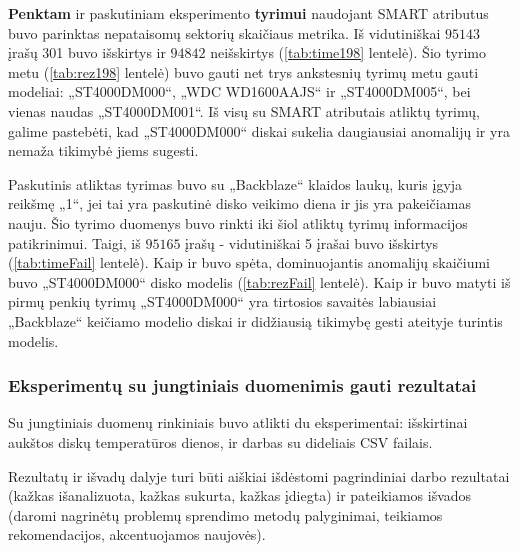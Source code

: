 \documentclass{VUMIFPSkursinis}
\begin{document}
\textbf{Penktam} ir paskutiniam eksperimento \textbf{tyrimui} naudojant SMART atributus buvo parinktas nepataisomų sektorių skaičiaus metrika. Iš vidutiniškai $95 143$ įrašų 301 buvo išskirtys ir $94 842$ neišskirtys (\ref{tab:time198} lentelė). Šio tyrimo metu (\ref{tab:rez198} lentelė) buvo gauti net trys ankstesnių tyrimų metu gauti modeliai: „ST4000DM000“, „WDC WD1600AAJS“ ir „ST4000DM005“, bei vienas naudas „ST4000DM001“. Iš visų su SMART atributais atliktų tyrimų, galime pastebėti, kad „ST4000DM000“ diskai sukelia daugiausiai anomalijų ir yra nemaža tikimybė jiems sugesti.

Paskutinis atliktas tyrimas buvo su „Backblaze“ klaidos laukų, kuris įgyja reikšmę „1“, jei tai yra paskutinė disko veikimo diena ir jis yra pakeičiamas nauju. Šio tyrimo duomenys buvo rinkti iki šiol atliktų tyrimų informacijos patikrinimui. Taigi, iš $95 165$ įrašų - vidutiniškai 5 įrašai buvo išskirtys (\ref{tab:timeFail} lentelė). Kaip ir buvo spėta, dominuojantis anomalijų skaičiumi buvo „ST4000DM000“ disko modelis (\ref{tab:rezFail} lentelė). Kaip ir buvo matyti iš pirmų penkių tyrimų „ST4000DM000“ yra tirtosios savaitės labiausiai „Backblaze“ keičiamo modelio diskai ir didžiausią tikimybę gesti ateityje turintis modelis.
 





\subsubsection{Eksperimentų su jungtiniais duomenimis gauti rezultatai}
Su jungtiniais duomenų rinkiniais buvo atlikti du eksperimentai: išskirtinai aukštos diskų temperatūros dienos, ir darbas su dideliais CSV failais.






Rezultatų ir išvadų dalyje turi būti aiškiai išdėstomi pagrindiniai darbo
rezultatai (kažkas išanalizuota, kažkas sukurta, kažkas įdiegta) ir pateikiamos
išvados (daromi nagrinėtų problemų sprendimo metodų palyginimai, teikiamos
rekomendacijos, akcentuojamos naujovės).

\printbibliography[heading=bibintoc]
\end{document}

